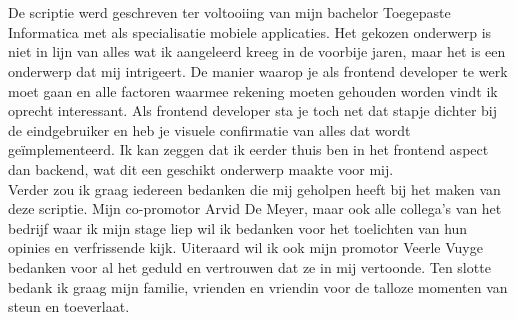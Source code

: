 
\chapter*{}
\label{ch:voorwoord}


De scriptie werd geschreven ter voltooiing van mijn bachelor Toegepaste Informatica met als specialisatie mobiele applicaties. Het gekozen onderwerp is niet in lijn van alles wat ik aangeleerd kreeg in de voorbije jaren, maar het is een onderwerp dat mij intrigeert. De manier waarop je als frontend developer te werk moet gaan en alle factoren waarmee rekening moeten gehouden worden vindt ik oprecht interessant. Als frontend developer sta je toch net dat stapje dichter bij de eindgebruiker en heb je visuele confirmatie van alles dat wordt geïmplementeerd. Ik kan zeggen dat ik eerder thuis ben in het frontend aspect dan backend, wat dit een geschikt onderwerp maakte voor mij. \\
Verder zou ik graag iedereen bedanken die mij geholpen heeft bij het maken van deze scriptie. Mijn co-promotor Arvid De Meyer, maar ook alle collega's van het bedrijf waar ik mijn stage liep wil ik bedanken voor het toelichten van hun opinies en verfrissende kijk. Uiteraard wil ik ook mijn promotor Veerle Vuyge bedanken voor al het geduld en vertrouwen dat ze in mij vertoonde. Ten slotte bedank ik graag mijn familie, vrienden en vriendin voor de talloze momenten van steun en toeverlaat.